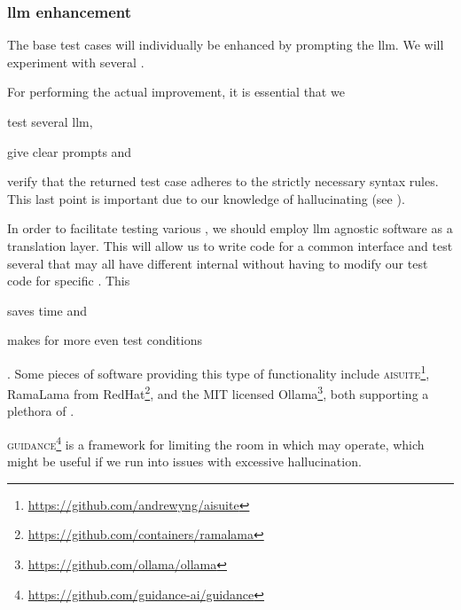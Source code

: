\subsubsection{\acrshort{llm} enhancement}\label{sec:llmEnhancement}

The base test cases will individually be enhanced by prompting the
\acrshort{llm}. We will experiment with several .

For performing the actual improvement, it is essential that we \begin{inparaenum}
    \item test several \acrshort{llm},
    \item give clear prompts
    and
    \item verify that the returned test case adheres to the strictly necessary
    syntax rules. This last point is important due to our knowledge of
     hallucinating (see ).
\end{inparaenum}

In order to facilitate testing various , we should employ
\acrshort{llm} agnostic software as a translation layer. This will allow us to
write code for a common interface and test several  that may all
have different internal  without having to modify our test code
for specific . This \begin{inparaenum}
    \item saves time
    and
    \item makes for more even test conditions \end{inparaenum}. Some pieces of software providing
this type of functionality include
\textsc{aisuite}\footnote{\url{https://github.com/andrewyng/aisuite}}, RamaLama from
RedHat\footnote{\url{https://github.com/containers/ramalama}}, and the MIT licensed
Ollama\footnote{\url{https://github.com/ollama/ollama}}, both supporting a plethora of
.

\textsc{guidance}\footnote{\url{https://github.com/guidance-ai/guidance}} is a
framework for limiting the room in which  may operate, which
might be useful if we run into issues with excessive hallucination.


